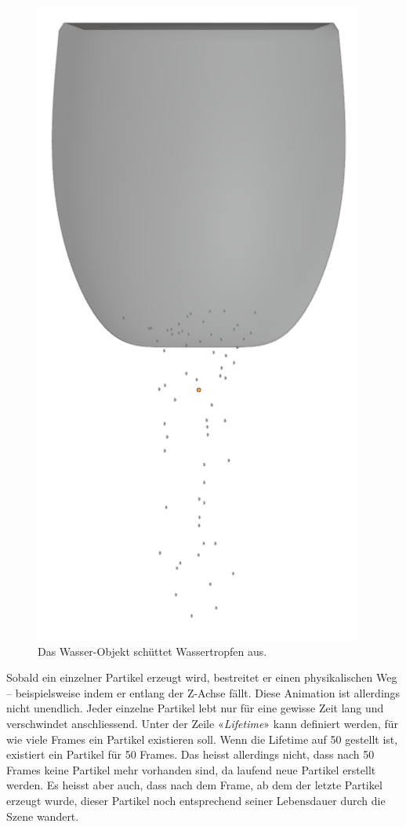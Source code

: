 \documentclass[
]{book}
\let\oldmarginnote\marginnote
\renewcommand{\marginnote}[1]{%
  \oldmarginnote{{\footnotesize\selectfont #1}}%
}
\begin{document}
\begin{figure}

\includegraphics{Chapters/Images/Chapter_38/38_12_Bubles_Emit.png}

\caption{\label{fig-1_12}Das Wasser-Objekt schüttet Wassertropfen aus.}

\end{figure}%

\marginnote{Tote Partikel}

Sobald ein einzelner Partikel erzeugt wird, bestreitet er einen
physikalischen Weg -- beispielsweise indem er entlang der Z-Achse fällt.
Diese Animation ist allerdings nicht unendlich. Jeder einzelne Partikel
lebt nur für eine gewisse Zeit lang und verschwindet anschliessend.
Unter der Zeile «\emph{Lifetime}» kann definiert werden, für wie viele
Frames ein Partikel existieren soll. Wenn die Lifetime auf 50 gestellt
ist, existiert ein Partikel für 50 Frames. Das heisst allerdings nicht,
dass nach 50 Frames keine Partikel mehr vorhanden sind, da laufend neue
Partikel erstellt werden. Es heisst aber auch, dass nach dem Frame, ab
dem der letzte Partikel erzeugt wurde, dieser Partikel noch entsprechend
seiner Lebensdauer durch die Szene wandert.
\end{document}
